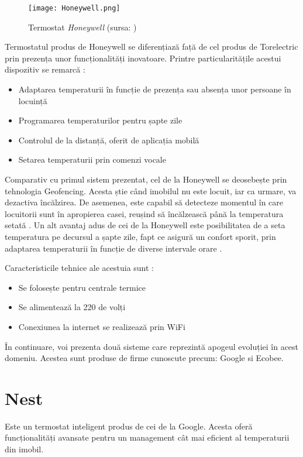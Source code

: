 \begin{wrapfigure}{l}{0.55\textwidth} 
	\centering
	\texttt{[image: Honeywell.png]}
	\caption{Termostat \textit{Honeywell} (sursa: \cite{honeywell})}
\end{wrapfigure}

	Termostatul produs de Honeywell se diferențiază față de cel produs de Torelectric prin prezența unor funcționalități inovatoare. Printre particularitățile acestui dispozitiv se remarcă \cite{honeywell}:
	\begin{itemize}
	\setlength{\itemindent}{2em}
		\itemsep0em
		\item Adaptarea temperaturii în funcție de prezența sau absența unor persoane în locuință 
		\item Programarea temperaturilor pentru șapte zile
		\item Controlul de la distanță, oferit de aplicația mobilă
		\item Setarea temperaturii prin comenzi vocale
	\end{itemize}

	Comparativ cu primul sistem prezentat, cel de la Honeywell se deosebește prin tehnologia Geofencing. Acesta știe când imobilul nu este locuit, iar ca urmare, va dezactiva încălzirea. De asemenea, este capabil să detecteze momentul în care locuitorii sunt în apropierea casei, reușind să încălzească până la temperatura setată \cite{honeywell}.
	Un alt avantaj adus de cei de la Honeywell este posibilitatea de a seta temperatura pe decursul a șapte zile, fapt ce asigură un confort sporit, prin adaptarea temperaturii în funcție de diverse intervale orare \cite{honeywell}.

	Caracteristicile tehnice ale acestuia sunt \cite{honeywell}:
	\begin{itemize}
	\setlength{\itemindent}{2em}
		\itemsep0em
		\item Se folosește pentru centrale termice
		\item Se alimentează la 220 de volți
		\item Conexiunea la internet se realizează prin WiFi
	\end{itemize}

	În continuare, voi prezenta două sisteme care reprezintă apogeul evoluției în acest domeniu. Acestea sunt produse de firme cunoscute precum: Google si Ecobee.

\section{Nest}
	Este un termostat inteligent produs de cei de la Google. Acesta oferă funcționalități avansate pentru un management cât mai eficient al temperaturii din imobil. 

